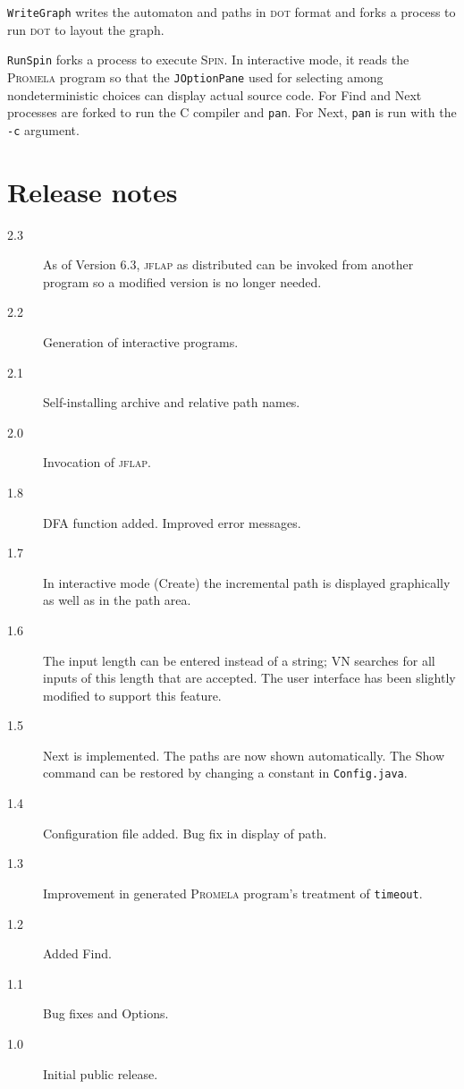 \documentclass[11pt]{article}
\newcommand{\vn}{\textsc{VN}}
\newcommand{\jf}{\textsc{jflap}}
\newcommand{\dt}{\textsc{dot}}
\newcommand{\spn}{\textsc{Spin}}
\newcommand{\prm}{\textsc{Promela}}
\newcommand{\p}[1]{\texttt{#1}}
\newcommand{\bu}[1]{\textsf{#1}}
\begin{document}
\p{WriteGraph} writes the automaton and paths in \dt{} format and forks a process to
run \dt{} to layout the graph.

\p{RunSpin} forks a process to execute \spn{}. In interactive mode, it reads the
\prm{} program so that the \p{JOptionPane} used for selecting among
nondeterministic choices can display actual source code. For \bu{Find} and
\bu{Next} processes are forked to run the C compiler and \p{pan}. 
For \bu{Next}, \p{pan} is run with the \p{-c} argument.


\appendix

\section{Release notes}

\begin{description}
\item[2.3] As of Version 6.3, \jf{} as distributed can be invoked from another
program so a modified version is no longer needed.
\item[2.2] Generation of interactive programs.
\item[2.1] Self-installing archive and relative path names.
\item[2.0] Invocation of \jf{}.
\item[1.8] \bu{DFA} function added. Improved error messages.
\item[1.7] In interactive mode (\bu{Create}) the incremental path is displayed
graphically as well as in the path area.
\item[1.6] The input length can be entered instead of a string;
\vn{} searches for all inputs of this length that are accepted.
The user interface has been slightly modified to support this feature.
\item[1.5] \bu{Next} is implemented. The paths are now shown automatically.
The \bu{Show} command can be restored by changing a constant
in \p{Config.java}.
\item[1.4] Configuration file added. Bug fix in display of path.
\item[1.3] Improvement in generated \prm{} program's treatment of \p{timeout}.
\item[1.2] Added \bu{Find}.
\item[1.1] Bug fixes and \bu{Options}.
\item[1.0] Initial public release.
\end{description}
\end{document}
